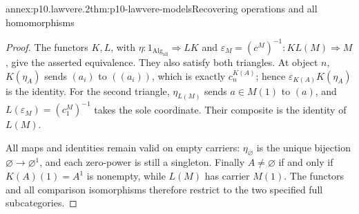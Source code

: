 \begin{annexitem}{annex:p10.lawvere.2}{thm:p10-lawvere-models}{Recovering operations and all homomorphisms}
\begin{proof}
The functors \(K,L\), with
\(\eta:1_{\operatorname{Alg}_{\mathrm{all}}}\Rightarrow LK\)
and \(\varepsilon_M=(c^M)^{-1}:KL(M)\Rightarrow M\), give
the asserted equivalence.
They also satisfy both triangles.
At object \(n\), \(K(\eta_A)\) sends
\((a_i)\) to \(((a_i))\), which is exactly \(c_n^{K(A)}\);
hence \(\varepsilon_{K(A)}K(\eta_A)\) is the identity.
For the second triangle, \(\eta_{L(M)}\) sends
\(a\in M(1)\) to \((a)\), and
\(L(\varepsilon_M)=(c_1^M)^{-1}\) takes the sole coordinate.
Their composite is the identity of \(L(M)\).

All maps and identities remain valid on empty carriers:
\(\eta_\varnothing\) is the unique bijection
\(\varnothing\to\varnothing^1\), and each zero-power is
still a singleton.
Finally \(A\ne\varnothing\) if and only if \(K(A)(1)=A^1\)
is nonempty, while \(L(M)\) has carrier \(M(1)\).
The functors and all comparison isomorphisms therefore
restrict to the two specified full subcategories.
\end{proof}
\end{annexitem}
